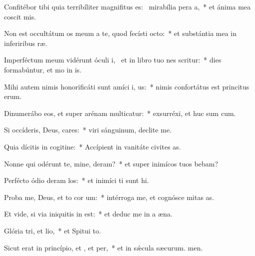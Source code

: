 \item Confitébor tibi quia terribíliter magnifitus es:~\pscross{} mirabília pera a,~* et ánima mea coscit mis.
\item Non est occultátum os meum a te, quod fecísti  octo:~* et substántia mea in inferiribus ræ.
\item Imperféctum meum vidérunt óculi i,~\pscross{} et in libro tuo nes scritur:~* dies formabúntur, et mo in is.
\item Mihi autem nimis honorificáti sunt amíci i, us:~* nimis confortátus est princitus erum.
\item Dinumerábo eos, et super arénam multicatur:~* exsurréxi, et huc sum cum.
\item Si occíderis, Deus, cares:~* viri sánguinum, declite  me.
\item Quia dícitis in cogitine:~* Accípient in vanitáte civites as.
\item Nonne qui odérunt te, mine, deram?~* et super inimícos tuos bebam?
\item Perfécto ódio deram los:~* et inimíci ti sunt hi.
\item Proba me, Deus, et to cor um:~* intérroga me, et cognósce mitas as.
\item Et vide, si via iniquitis in  est:~* et deduc me in a æna.
\item Glória tri, et lio,~* et Spitui to.
\item Sicut erat in princípio, et , et per,~* et in sǽcula sæcurum. men.
